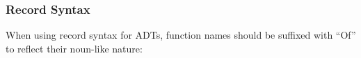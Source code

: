 \documentclass{article}
\begin{document}
\subsubsection{Record Syntax}\label{record-syntax}

When using record syntax for ADTs, function names should be suffixed
with ``Of'' to reflect their noun-like nature:

\begin{Shaded}
\begin{Highlighting}[]
  \FunctionTok{=}  \NormalTok{\{} 
                       \NormalTok{,} 
                       \NormalTok{,} \NormalTok{[}\NormalTok{] \}}
                        \NormalTok{(}\NormalTok{, }\NormalTok{)}
\end{Highlighting}
\end{Shaded}
\end{document}
